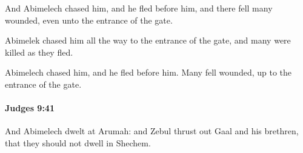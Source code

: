 			\begin{versebox}
					\item[BHS] 
					\item[ASV] And Abimelech chased him, and he fled before him, and there fell many wounded, even unto the entrance of the gate.
					\item[NIV] Abimelek chased him all the way to the entrance of the gate, and many were killed as they fled.
					\item[NRSV] Abimelech chased him, and he fled before him. Many fell wounded, up to the entrance of the gate.
			\end{versebox}

		\paragraph{Judges 9:41} %
			\label{JUDGES-9-41}

			And Abimelech dwelt at Arumah: and Zebul thrust out Gaal and his brethren, that they should not dwell in Shechem.

